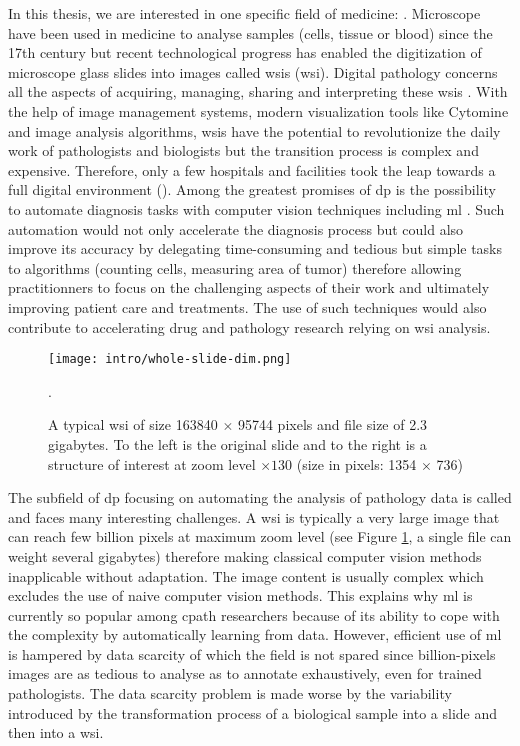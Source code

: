 In this thesis, we are interested in one specific field of medicine: . Microscope have been used in medicine to analyse samples (\eg cells, tissue or blood) since the 17th century \parencite{hajdu2002first} but recent technological progress has enabled the digitization of microscope glass slides into images called \acrlong{wsi}s (\acrshort{wsi}). Digital pathology concerns all the aspects of acquiring, managing, sharing and interpreting these \acrshort{wsi}s \parencite{doolan2019whatisdp}. With the help of image management systems, modern visualization tools like Cytomine \parencite{maree2016collaborative} and image analysis algorithms, \acrshort{wsi}s have the potential to revolutionize the daily work of pathologists and biologists but the transition process is complex and expensive. Therefore, only a few hospitals and facilities took the leap towards a full digital environment (\eg \cite{stathonikos2013going, eloy2021digital, temprana2022digipatics}). Among the greatest promises of \acrlong{dp} is the possibility to automate diagnosis tasks with computer vision techniques including \acrlong{ml} \parencite{ciompi2021editorial}. Such automation would not only accelerate the diagnosis process but could also improve its accuracy by delegating time-consuming and tedious but simple tasks to algorithms (\eg counting cells, measuring area of tumor) therefore allowing practitionners to focus on the challenging aspects of their work and ultimately improving patient care and treatments. The use of such techniques would also contribute to accelerating drug and pathology research relying on \acrlong{wsi} analysis. 

\begin{figure}
  \centering
  \texttt{[image: intro/whole-slide-dim.png]}
  \caption{A typical \acrlong{wsi} of size 163840 $\times$ 95744 pixels and file size of 2.3 gigabytes. To the left is the original slide and to the right is a structure of interest at zoom level $\times130$ (size in pixels: 1354 $\times$ 736)}.
  \label{fig:intro:wsi}
\end{figure}

The subfield of \acrlong{dp} focusing on automating the analysis of pathology data is called  and faces many interesting challenges. A \acrshort{wsi} is typically a very large image that can reach few billion pixels at maximum zoom level (see Figure \ref{fig:intro:wsi}, a single file can weight several gigabytes) therefore making classical computer vision methods inapplicable without adaptation. The image content is usually complex which excludes the use of naive computer vision methods. This explains why \acrlong{ml} is currently so popular among \acrlong{cpath} researchers because of its ability to cope with the complexity by automatically learning from data. However, efficient use of \acrlong{ml} is hampered by data scarcity of which the field is not spared since billion-pixels images are as tedious to analyse as to annotate exhaustively, even for trained pathologists. The data scarcity problem is made worse by the variability introduced by the transformation process of a biological sample into a slide and then into a \acrlong{wsi}.

